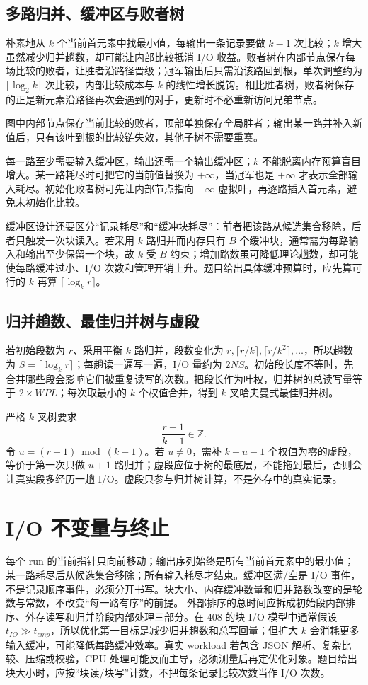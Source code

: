 \documentclass[UTF8,fontset=none,11pt,a4paper]{ctexart}
\begin{document}
\subsection{多路归并、缓冲区与败者树}
朴素地从 $k$ 个当前首元素中找最小值，每输出一条记录要做 $k-1$ 次比较；$k$ 增大虽然减少归并趟数，却可能让内部比较抵消 I/O 收益。败者树在内部节点保存每场比较的败者，让胜者沿路径晋级；冠军输出后只需沿该路回到根，单次调整约为 $\lceil\log_2 k\rceil$ 次比较，内部比较成本与 $k$ 的线性增长脱钩。相比胜者树，败者树保存的正是新元素沿路径再次会遇到的对手，更新时不必重新访问兄弟节点。

\begin{center}

\end{center}
图中内部节点保存当前比较的败者，顶部单独保存全局胜者；输出某一路并补入新值后，只有该叶到根的比较链失效，其他子树不需要重赛。

每一路至少需要输入缓冲区，输出还需一个输出缓冲区；$k$ 不能脱离内存预算盲目增大。某一路耗尽时可把它的当前值替换为 $+\infty$，当冠军也是 $+\infty$ 才表示全部输入耗尽。初始化败者树可先让内部节点指向 $-\infty$ 虚拟叶，再逐路插入首元素，避免未初始化比较。

缓冲区设计还要区分“记录耗尽”和“缓冲块耗尽”：前者把该路从候选集合移除，后者只触发一次块读入。若采用 $k$ 路归并而内存只有 $B$ 个缓冲块，通常需为每路输入和输出至少保留一个块，故 $k$ 受 $B$ 约束；增加路数虽可降低理论趟数，却可能使每路缓冲过小、I/O 次数和管理开销上升。题目给出具体缓冲预算时，应先算可行的 $k$ 再算 $\lceil\log_k r\rceil$。

\subsection{归并趟数、最佳归并树与虚段}
若初始段数为 $r$、采用平衡 $k$ 路归并，段数变化为 $r,\lceil r/k\rceil,\lceil r/k^2\rceil,\ldots$，所以趟数为 $S=\lceil\log_k r\rceil$；每趟读一遍写一遍，I/O 量约为 $2NS$。初始段长度不等时，先合并哪些段会影响它们被重复读写的次数。把段长作为叶权，归并树的总读写量等于 $2\times WPL$；每次取最小的 $k$ 个权值合并，得到 $k$ 叉哈夫曼式最佳归并树。

严格 $k$ 叉树要求
\[
\frac{r-1}{k-1}\in\mathbb Z.
\]
令 $u=(r-1)\bmod(k-1)$。若 $u\ne0$，需补 $k-u-1$ 个权值为零的虚段，等价于第一次只做 $u+1$ 路归并；虚段应位于树的最底层，不能拖到最后，否则会让真实段多经历一趟 I/O。虚段只参与归并树计算，不是外存中的真实记录。

\section{I/O 不变量与终止}
每个 run 的当前指针只向前移动；输出序列始终是所有当前首元素中的最小值；某一路耗尽后从候选集合移除；所有输入耗尽才结束。缓冲区满/空是 I/O 事件，不是记录顺序事件，必须分开书写。块大小、内存缓冲数量和归并路数改变的是轮数与常数，不改变“每一路有序”的前提。
外部排序的总时间应拆成初始段内部排序、外存读写和归并阶段内部处理三部分。在 408 的块 I/O 模型中通常假设 $t_{IO}\gg t_{cmp}$，所以优化第一目标是减少归并趟数和总写回量；但扩大 $k$ 会消耗更多输入缓冲，可能降低每路缓冲效率。真实 workload 若包含 JSON 解析、复杂比较、压缩或校验，CPU 处理可能反而主导，必须测量后再定优化对象。题目给出块大小时，应按“块读/块写”计数，不把每条记录比较次数当作 I/O 次数。
\end{document}
